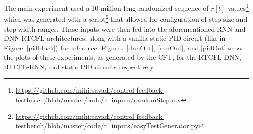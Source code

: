\documentclass[10pt,twocolumn,letterpaper]{article}
\begin{document}
            The main experiment used a 10-million long randomized sequence of $r[t]$
            values\footnote{\url{https://github.com/mihirsavadi/control-feedback-testbench/blob/master/code/r_inputs/randomStep.csv}}
            which was generated with a
            script\footnote{\url{https://github.com/mihirsavadi/control-feedback-testbench/blob/master/code/r_inputs/easyTestGenerator.py}}
            that allowed for configuration of step-size and step-width ranges. These inputs were then fed into the
            aforementioned RNN and DNN RTCFL architectures, along with a vanilla static PID circuit (like in
            Figure~\ref{pidblock}) for reference. Figures~\ref{dnnOut}, \ref{rnnOut}, and \ref{pidOut} show the plots of
            these experiments, as generated by the CFT, for the RTCFL-DNN, RTCFL-RNN, and static PID circuits
            respectively.
\end{document}
